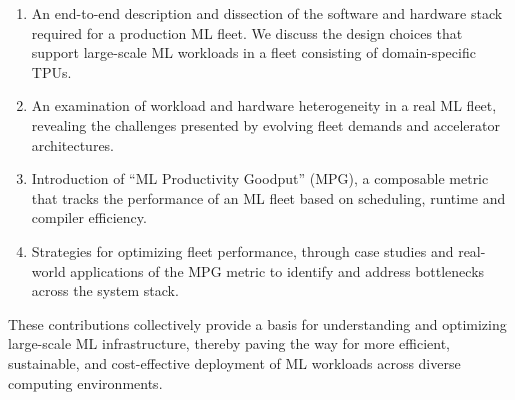 \begin{enumerate}
    
    \item An end-to-end description and dissection of the software and hardware stack required for a production ML fleet. We discuss the design choices that support large-scale ML workloads in a fleet consisting of domain-specific TPUs.

    \item An examination of workload and hardware heterogeneity in a real ML fleet, revealing the challenges presented by evolving fleet demands and accelerator architectures.

    \item Introduction of ``ML Productivity Goodput'' (MPG), a composable metric that tracks the performance of an ML fleet based on scheduling, runtime and compiler efficiency. 

    \item Strategies for optimizing fleet performance, through case studies and real-world applications of the MPG metric to identify and address bottlenecks across the system stack.
    
    

    
    

\end{enumerate}

These contributions collectively provide a basis for understanding and optimizing large-scale ML infrastructure, thereby paving the way for more efficient, sustainable, and cost-effective deployment of ML workloads across diverse computing environments.








